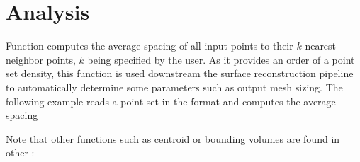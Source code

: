 \section{Analysis}

Function  computes the average spacing of all input points to their $k$ nearest neighbor points, $k$ being specified by the user. As it provides an order of a point set density, this function is used downstream the surface reconstruction pipeline to automatically determine some parameters such as output mesh sizing.
The following example reads a point set in the  format and computes the average spacing

Note that other functions such as centroid or bounding volumes are found in other \cgal \components:
  \\
  \\
  \\

